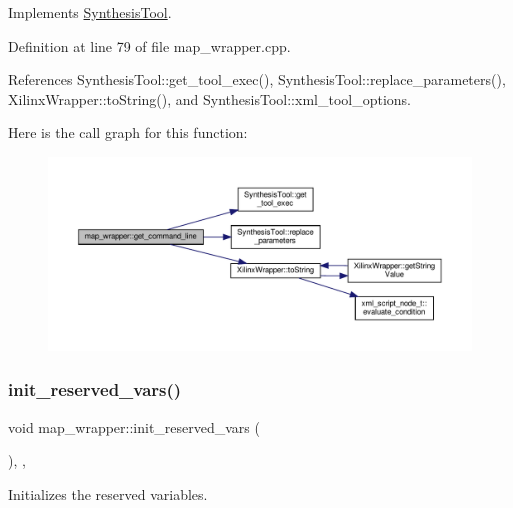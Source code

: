 Implements \hyperlink{classSynthesisTool_a8eb2ef7a6230a997a2467d298613c045}{Synthesis\+Tool}.



Definition at line 79 of file map\+\_\+wrapper.\+cpp.



References Synthesis\+Tool\+::get\+\_\+tool\+\_\+exec(), Synthesis\+Tool\+::replace\+\_\+parameters(), Xilinx\+Wrapper\+::to\+String(), and Synthesis\+Tool\+::xml\+\_\+tool\+\_\+options.

Here is the call graph for this function\+:
\nopagebreak
\begin{figure}[H]
\begin{center}
\leavevmode
\includegraphics[width=350pt]{d4/d76/classmap__wrapper_ac788d77f3b80833d49e2dbce39038a1a_cgraph}
\end{center}
\end{figure}
\mbox{\label{classmap__wrapper_a206084d1b97e49db459560b12e6175df}} 
\subsubsection{\texorpdfstring{init\+\_\+reserved\+\_\+vars()}{init\_reserved\_vars()}}
{\footnotesize\ttfamily void map\+\_\+wrapper\+::init\+\_\+reserved\+\_\+vars (\begin{DoxyParamCaption}{ }\end{DoxyParamCaption})\hspace{0.3cm}{\ttfamily [override]}, {\ttfamily [protected]}, {\ttfamily [virtual]}}



Initializes the reserved variables. 



